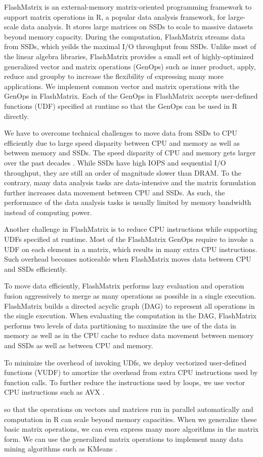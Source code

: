 FlashMatrix is an external-memory matrix-oriented programming framework
to support matrix operations in R, a popular data analysis framework, for
large-scale data analysis. It stores large matrices on SSDs to scale to
massive datasets beyond memory capacity. During the computation, FlashMatrix
streams data from SSDs, which yeilds the maximal I/O throughput from SSDs.
Unlike most of the linear algebra libraries, FlashMatrix provides a small
set of highly-optimized generalized vector and matrix operations (GenOps)
such as inner product, apply, reduce and groupby to increase the flexibility
of expressing many more applications. We implement common vector and matrix
operations with the GenOps in FlashMatrix. Each of the GenOps in FlashMatrix
accepts user-defined functions (UDF) specified at runtime so that the GenOps
can be used in R directly.


We have to overcome technical challenges to move data from SSDs to CPU efficiently
due to large speed disparity between CPU and memory as well as between memory and
SSDs. The speed disparity of CPU and memory gets larger over the past decades
\cite{Wilkes01}. While SSDs have high IOPS and sequential I/O throughput,
they are still an order of magnitude slower than DRAM.
To the contrary, many data analysis tasks are data-intensive and the matrix
formulation further increases data movement between CPU and SSDs. As such,
the performance of the data analysis tasks is usually limited by memory
bandwidth instead of computing power.

Another challenge in FlashMatrix is to reduce CPU instructions while supporting
UDFs specified at runtime. Most of the FlashMatrix GenOps require to invoke
a UDF on each element in a matrix, which results in many extra CPU instructions.
Such overhead becomes noticeable when FlashMatrix moves data between CPU and
SSDs efficiently.

To move data efficiently, FlashMatrix performs lazy evaluation and operation
fusion aggressively to merge as many operations as possible in a single execution.
FlashMatrix builds a directed acyclic graph (DAG) to represent all operations
in the single execution. When evaluating the computation in the DAG, FlashMatrix
performs two levels of data partitioning to maximize the use of the data in memory
as well as in the CPU cache to reduce data movement between memory and SSDs
as well as between CPU and memory.

To minimize the overhead of invoking UDfs, we deploy vectorized user-defined
functions (VUDF) to amortize the overhead from extra CPU instructions used by
function calls. To further reduce the instructions used by loops, we use
vector CPU instructions such as AVX \cite{avx}.


so that the operations
on vectors and matrices run in parallel automatically and computation in R
can scale beyond memory capacities.
When we generalize these basic matrix operations, we can even express many more
algorithms in the matrix form. We can use the generalized matrix operations to
implement many data mining algorithms such as KMeans \cite{kmeans}.


